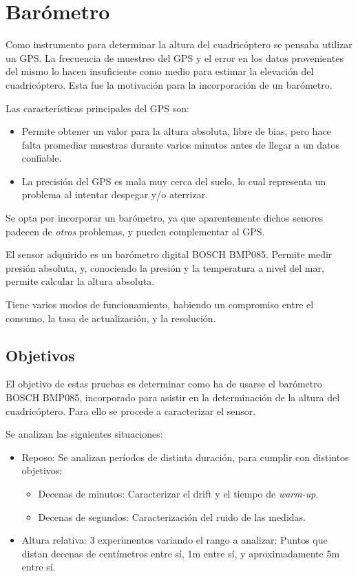 \documentclass[spanish,12pt,a4paper,titlepage]{report}
\begin{document}
\chapter{Barómetro}
\label{chap:barometro}

Como instrumento para determinar la altura del cuadricóptero se pensaba utilizar un GPS. La frecuencia de muestreo del GPS y el error en los datos provenientes del mismo lo hacen insuficiente como medio para estimar la elevación del cuadricóptero. Esta fue la motivación para la incorporación de un barómetro.

Las características principales del GPS son:
\begin{itemize}
\item Permite obtener un valor para la altura absoluta, libre de bias, pero hace falta promediar muestras durante varios minutos antes de llegar a un datos confiable.
\item  La precisión del GPS es mala muy cerca del suelo, lo cual representa un problema al intentar despegar y/o aterrizar.
\end{itemize}

Se opta por incorporar un barómetro, ya que aparentemente dichos senores padecen de \textit{otros} problemas, y pueden complementar al GPS.

El sensor adquirido es un barómetro digital BOSCH BMP085. Permite medir presión absoluta, y, conociendo la presión y la temperatura a nivel del mar, permite calcular la altura absoluta.

Tiene varios modos de funcionamiento, habiendo un compromiso entre el consumo, la tasa de actualización, y la resolución.

\section{Objetivos}

El objetivo de estas pruebas es determinar como ha de usarse el barómetro BOSCH BMP085, incorporado para asistir en la determinación de la altura del cuadricóptero. Para ello se procede a caracterizar el sensor.

Se analizan las siguientes situaciones:

\begin{itemize}
\item Reposo: Se analizan períodos de distinta duración, para cumplir con distintos objetivos:
  \begin{itemize}
  \item Decenas de minutos: Caracterizar el drift y el tiempo de \textit{warm-up}.
  \item Decenas de segundos: Caracterización del ruido de las medidas.
  \end{itemize}
\item Altura relativa: 3 experimentos variando el rango a analizar: Puntos que distan decenas de centímetros entre sí, 1m entre sí, y aproximadamente 5m entre sí.
\end{itemize}
\end{document}

